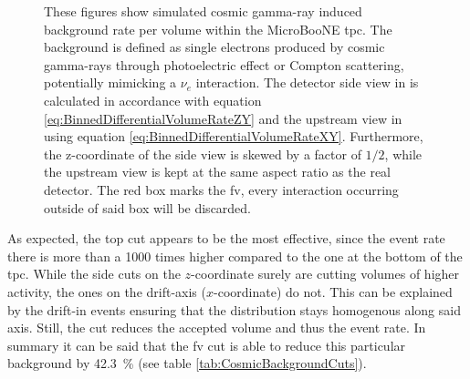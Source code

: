 \begin{figure}[htbp]
    \centering
    \caption[Simulated Cosmic Photon Background Rate per Volume in the MicroBooNE TPC]{These figures show simulated cosmic gamma-ray induced background rate per volume within the MicroBooNE \gls{tpc}. The background is defined as single electrons produced by cosmic gamma-rays through photoelectric effect or Compton scattering, potentially mimicking a $\nu_e$ interaction. The detector side view in  is calculated in accordance with equation \ref{eq:BinnedDifferentialVolumeRateZY} and the upstream view in  using equation \ref{eq:BinnedDifferentialVolumeRateXY}. Furthermore, the z-coordinate of the side view is skewed by a factor of $1/2$, while the upstream view is kept at the same aspect ratio as the real detector. The red box marks the \gls{fv}, \ie every interaction occurring outside of said box will be discarded.}
    \label{fig:GammaBackgroundDistribution}
\end{figure}
As expected, the top cut appears to be the most effective, since the event rate there is more than a \num{1000} times higher compared to the one at the bottom of the \gls{tpc}. While the side cuts on the $z$-coordinate surely are cutting volumes of higher activity, the ones on the drift-axis ($x$-coordinate) do not. This can be explained by the drift-in events ensuring that the distribution stays homogenous along said axis. Still, the cut reduces the accepted volume and thus the event rate. In summary it can be said that the \gls{fv} cut is able to reduce this particular background by \SI{42.3}{\percent} (see table \ref{tab:CosmicBackgroundCuts}).

